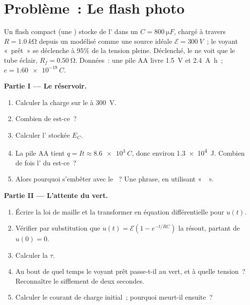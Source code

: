 \section{Problème~: Le flash photo}

\begin{problem}
\label{pb:g12:rc-rl-circuits:1}
Un flash compact (une ) stocke de
l' dans un
 $C = \qty{800}{\micro F}$, chargé à travers
$R = \qty{1.0}{k\ohm}$ depuis un  modélisé
comme une source idéale $\mathcal{E} = \qty{300}{V}$~; le voyant
«~prêt~» se déclenche à $95\%$ de la tension pleine.
Déclenché, le  ne voit que le tube éclair,
$R_f = \qty{0.50}{\ohm}$. Données~: une pile AA livre \qty{1.5}{V} et
\qty{2.4}{A.h}~; $e = \qty{1.60e-19}{C}$.

\medskip
\noindent\textbf{Partie I --- Le réservoir.}
\begin{enumerate}
  \item Calculer la charge sur le  à
        \qty{300}{V}.
  \item Combien de 
        est-ce~?
  \item Calculer l' stockée $E_C$.
  \item La pile AA tient $q = It \approx \qty{8.6e3}{C}$, donc environ
        \qty{1.3e4}{J}. Combien de fois l' du
         est-ce~?
  \item Alors pourquoi s'embêter avec le
        ~? Une phrase, en utilisant
        «~~».
\end{enumerate}

\medskip
\noindent\textbf{Partie II --- L'attente du vert.}
\begin{enumerate}[resume]
  \item Écrire la loi de maille et la transformer en équation
        différentielle pour $u(t)$.
  \item Vérifier par substitution que
        $u(t) = \mathcal{E}(1 - e^{-t/RC})$ la résout, partant de
        $u(0) = 0$.
  \item Calculer la  $\tau$.
  \item Au bout de quel temps le voyant prêt passe-t-il au vert, et à
        quelle tension~? Reconnaître le sifflement de
        deux secondes.
  \item Calculer le courant de charge initial~; pourquoi meurt-il
        ensuite~?
\end{enumerate}


\end{problem}

